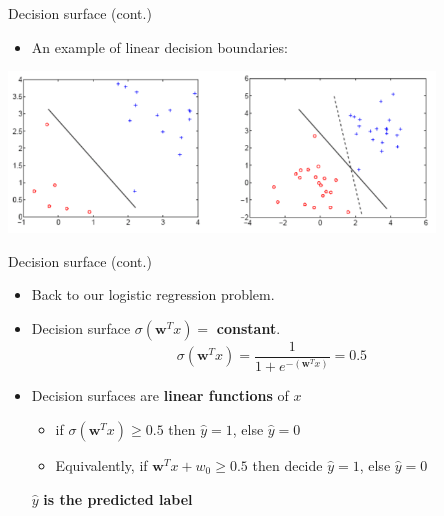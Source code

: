\documentclass[serif, aspectratio=169]{beamer}
\begin{document}
\begin{frame}{Decision surface (cont.)}

    \begin{itemize}
        \item An example of linear decision boundaries:
    \end{itemize}
    \begin{center}
        \includegraphics[width=0.85\textwidth]{pic/DBoundary.png}
    \end{center}
\end{frame}

\begin{frame}{Decision surface (cont.)}
    \begin{itemize}
      \item Back to our logistic regression problem.
      \item Decision surface $\sigma (\mathbf{w}^Tx) = $ \textbf{constant}.
        \[
            \sigma (\mathbf{w}^Tx) = \frac{1}{1 + e^{-(\mathbf{w}^Tx)}} = 0.5
        \]
      \item Decision surfaces are \textbf{linear functions} of $x$
        \begin{itemize}
            \item if $\sigma (\mathbf{w}^Tx) \geq 0.5$ then $\hat{y}=1$, else $\hat{y} = 0$
            \item Equivalently, if $\mathbf{w}^Tx + w_0 \geq 0.5$ then decide $\hat{y}=1$, else $\hat{y}=0$
        \end{itemize}%
        \vfill
        \begin{center}
            \( \hat{y} \) \textbf{is the predicted label}
        \end{center}
    \end{itemize}
\end{frame}
\end{document}
